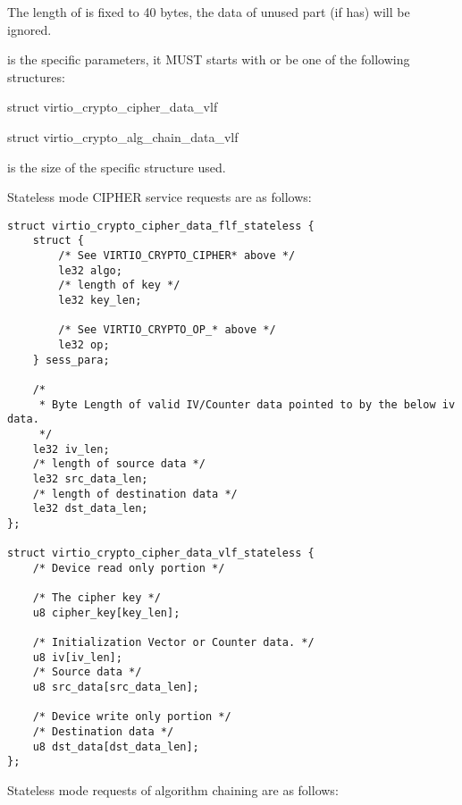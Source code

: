 The length of  is fixed to 40 bytes, the data of unused
part (if has) will be ignored.

 is the  specific parameters, it MUST starts
with or be one of the following structures:
\begin{itemize*}
\item struct virtio_crypto_cipher_data_vlf
\item struct virtio_crypto_alg_chain_data_vlf
\end{itemize*}

 is the size of the specific structure used.

Stateless mode CIPHER service requests are as follows:

\begin{lstlisting}
struct virtio_crypto_cipher_data_flf_stateless {
    struct {
        /* See VIRTIO_CRYPTO_CIPHER* above */
        le32 algo;
        /* length of key */
        le32 key_len;

        /* See VIRTIO_CRYPTO_OP_* above */
        le32 op;
    } sess_para;

    /*
     * Byte Length of valid IV/Counter data pointed to by the below iv data.
     */
    le32 iv_len;
    /* length of source data */
    le32 src_data_len;
    /* length of destination data */
    le32 dst_data_len;
};

struct virtio_crypto_cipher_data_vlf_stateless {
    /* Device read only portion */

    /* The cipher key */
    u8 cipher_key[key_len];

    /* Initialization Vector or Counter data. */
    u8 iv[iv_len];
    /* Source data */
    u8 src_data[src_data_len];

    /* Device write only portion */
    /* Destination data */
    u8 dst_data[dst_data_len];
};
\end{lstlisting}

Stateless mode requests of algorithm chaining are as follows:

